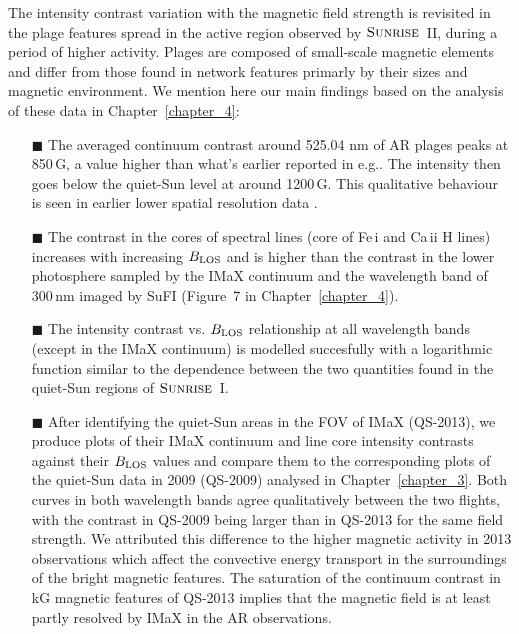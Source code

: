 \documentclass[goettingen, gauss, print]{thesis}
\begin{document}
The intensity contrast variation with the magnetic field strength is revisited in the plage features spread in the active region observed by $\textsc{Sunrise}$~II, during a period of higher activity. Plages are composed of small-scale magnetic elements and differ from those found in network features primarly by their sizes and magnetic environment. We mention here our main findings based on the analysis of these data in Chapter~\ref{chapter_4}:
\begin{itemize}
\item[$\blacksquare$] The averaged continuum contrast around 525.04 nm of AR plages peaks at 850\,G, a value higher than what's earlier reported in e.g.\citep{narayan_small-scale_2010,kobel_continuum_2011}. The intensity then goes below the quiet-Sun level at around 1200\,G. This qualitative behaviour is seen in earlier lower spatial resolution data \citep{kobel_continuum_2011}.

\item[$\blacksquare$] The contrast in the cores of spectral lines (core of  Fe\,{\sc i} and Ca\,{\sc ii} H lines) increases with increasing $B_{\rm LOS}$ and is higher than the contrast in the lower photosphere sampled by the IMaX continuum and the wavelength band of 300\,nm imaged by SuFI (Figure~7 in Chapter~\ref{chapter_4}).

\item[$\blacksquare$] The intensity contrast vs. $B_{\rm LOS}$ relationship at all wavelength bands (except in the IMaX continuum) is modelled succesfully with a logarithmic function similar to the dependence between the two quantities found in the quiet-Sun regions of $\textsc{Sunrise}$~I.   

\item[$\blacksquare$] After identifying the quiet-Sun areas in the FOV of IMaX (QS-2013), we produce plots of their IMaX continuum and line core intensity contrasts against their $B_{\rm LOS}$ values and compare them to the corresponding plots of the quiet-Sun data in 2009 (QS-2009) analysed in Chapter~\ref{chapter_3}. Both curves in both wavelength bands agree qualitatively between the two flights, with the contrast in QS-2009 being larger than in QS-2013 for the same field strength. We attributed this difference to the higher magnetic activity in 2013 observations which affect the convective energy transport in the surroundings of the bright magnetic features. The saturation of the continuum contrast in kG magnetic features of QS-2013 implies that the magnetic field is at least partly resolved by IMaX in the AR observations.


\end{itemize}
\end{document}
